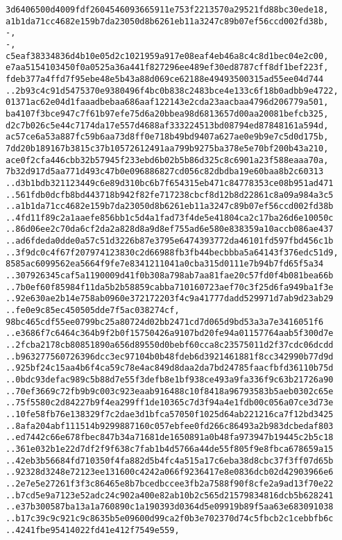 \documentclass[
]{article}
\begin{document}
\begin{verbatim}
3d6406500d4009fdf2604546093665911e753f2213570a29521fd88bc30ede18,
a1b1da71cc4682e159b7da23050d8b6261eb11a3247c89b07ef56ccd002fd38b,
-,
-,
c5eaf38334836d4b10e05d2c1021959a917e08eaf4eb46a8c4c8d1bec04e2c00,
e7aa5154103450f0a0525a36a441f827296ee489ef30ed8787cff8df1bef223f,
fdeb377a4ffd7f95ebe48e5b43a88d069ce62188e49493500315ad55ee04d744
..2b93c4c91d5475370e9380496f4bc0b838c2483bce4e133c6f18b0adbb9e4722,
01371ac62e04d1faaadbebaa686aaf122143e2cda23aacbaa4796d206779a501,
ba4107f3bce947c7f61b97efe75d6a20bbea98d6813657d00aa20081befcb325,
d2c7b026c5e44c7174da17e557d4688af333224513bd08794ed87848161a594d,
ac57ce6a53a887fc59b6aa73d8ff0e718b49bd9407a627ae0e9b9e7c5d0d175b,
7dd20b189167b3815c37b10572612491aa799b9275ba378e5e70bf200b43a210,
ace0f2cfa446cbb32b57945f233ebd6b02b5b86d325c8c6901a23f588eaaa70a,
7b32d917d5aa771d493c47b0e096886827cd056c82dbdba19e60baa8b2c60313
..d3b1bdb321123449c6e89d310bc6b7f654315eb471c84778353ce08b951ad471
..561fdb0dcfb8bd443718b942f82fe717238cbcf8d12b8d22861c8a09a984a3c5
..a1b1da71cc4682e159b7da23050d8b6261eb11a3247c89b07ef56ccd002fd38b
..4fd11f89c2a1aaefe856bb1c5d4a1fad73f4de5e41804ca2c17ba26d6e10050c
..86d06ee2c70da6cf2da2a828d8a9d8ef755ad6e580e838359a10accb086ae437
..ad6fdeda0dde0a57c51d3226b87e3795e6474393772da46101fd597fbd456c1b
..3f9dc0c4f67f207974123830c2d66988fb3fb44becbbba5a64143f376edc51d9,
8585ac6099562ea5664f9fe7e8341211041a0cba315d0111e7b94b7fd65f5a34
..307926345caf5a1190009d41f0b308a798ab7aa81fae20c57fd0f4b081bea66b
..7b0ef60f85984f11da5b2b58859cabba710160723aef70c3f25d6fa949ba1f3e
..92e630ae2b14e758ab0960e372172203f4c9a41777dadd529971d7ab9d23ab29
..fe0e9c85ec450505dde7f5ac038274cf,
98bc465cdf55ee0799bc25a80724d02bb2471cd7d065d9bd53a3a7e3416051f6
..e3686f7c6464c364b9f2b0f15750426a9107bd20fe94a01157764aab5f300d7e
..2fcba2178cb80851890a656d89550d0bebf60cca8c23575011d2f37cdc06dcdd
..b963277560726396dcc3ec97104b0b48fdeb6d3921461881f8cc342990b77d9d
..925bf24c15aa4b6f4ca59c78e4ac849d8daa2da7bd24785faacfbfd36110b75d
..0bdc93defac989c5b88d7e55f3defb8e1bf938ce493a9fa336f9c63b21726a90
..70ef3669c72fb9b9c003c923eaab916488c10f8418a96793583b5aeb0302c65e
..75f5580c2d84227b9f4ea299ff1de10365c7d3f94a4e1fdb00c056a07ce3d73e
..10fe58fb76e138329f7c2dae3d1bfca57050f1025d64ab221216ca7f12bd3425
..8afa204abf111514b9299887160c057ebfee0fd266c86493a2b983dcbedaf803
..ed7442c66e678fbec847b34a71681de1650891a0b48fa973947b19445c2b5c18
..361e032b1e22d7df2f9f638c7fab1b4d5766a44de55f805f9e8fbca678659a15
..42eb3b56684fd710350f4fa882d5b4fc4a515a17c6eba38d8cbc37f3ff07d65b
..92328d3248e72123ee131600c4242a066f9236417e8e0836dcb02d42903966e6
..2e7e5e27261f3f3c86465e8b7bcedbccee3fb2a7588f90f8cfe2a9ad13f70e22
..b7cd5e9a7123e52adc24c902a400e82ab10b2c565d21579834816dcb5b628241
..e37b300587ba13a1a760890c1a190393d0364d5e09919b89f5aa63e683091038
..b17c39c9c921c9c8635b5e09600d99ca2f0b3e702370d74c5fbcb2c1cebbfb6c
..4241fbe95414022fd41e412f7549e559,
\end{verbatim}
\end{document}
